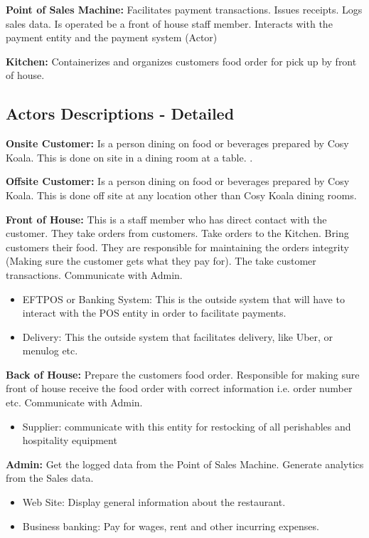 \documentclass{article}
\begin{document}
\textbf{Point of Sales Machine:} Facilitates payment transactions. Issues receipts. Logs sales data. Is operated be a front of house staff member. Interacts with the payment entity and the payment system (Actor)

\textbf{Kitchen:} Containerizes and organizes customers food order for pick up by front of house.

\subsection{Actors Descriptions - Detailed}

\textbf{Onsite Customer:} Is a person dining on food or beverages prepared by Cosy Koala. This is done on site in a dining room at a table. .

\textbf{Offsite Customer:} Is a person dining on food or beverages prepared by Cosy Koala. This is done off site at any location other than Cosy Koala dining rooms.

\textbf{Front of House:} This is a staff member who has direct contact with the customer. They take orders from customers. Take orders to the Kitchen. Bring customers their food. They are responsible for maintaining the orders integrity (Making sure the customer gets what they pay for). The take customer transactions. Communicate with Admin.
\begin{itemize}
    \item {EFTPOS or Banking System:} This is the outside system that will have to interact with the POS entity in order to facilitate payments.
    \item {Delivery:} This the outside system that facilitates delivery, like Uber, or menulog etc.
\end{itemize}

\textbf{Back of House:} Prepare the customers food order. Responsible for making sure front of house receive the food order with correct information i.e. order number etc. Communicate with Admin.
\begin{itemize}
    \item Supplier: communicate with this entity for restocking of all perishables and hospitality equipment
\end{itemize}

\textbf{Admin:} Get the logged data from the Point of Sales Machine.
Generate analytics from the Sales data.
\begin{itemize}
    \item Web Site: Display general information about the restaurant.
    \item Business banking: Pay for wages, rent and other incurring expenses.
\end{itemize}
\end{document}
